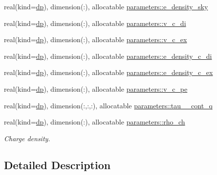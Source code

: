 \begin{DoxyCompactItemize}
\item 
real(kind=\mbox{\hyperlink{namespaceparameters_a52f8c6351fd79345d8811e065bcbbb37}{dp}}), dimension(\+:), allocatable \mbox{\hyperlink{group__OTHER__DENSITIES_ga899215cff7de8d505ca9437a2c7a9e5d}{parameters\+::e\+\_\+density\+\_\+sky}}
\item 
real(kind=\mbox{\hyperlink{namespaceparameters_a52f8c6351fd79345d8811e065bcbbb37}{dp}}), dimension(\+:), allocatable \mbox{\hyperlink{group__OTHER__DENSITIES_ga7503ebd6515d35346e8989c0ace67040}{parameters\+::v\+\_\+c\+\_\+di}}
\item 
real(kind=\mbox{\hyperlink{namespaceparameters_a52f8c6351fd79345d8811e065bcbbb37}{dp}}), dimension(\+:), allocatable \mbox{\hyperlink{group__OTHER__DENSITIES_ga9fa9512dcae76285fafca5bf94f6d548}{parameters\+::v\+\_\+c\+\_\+ex}}
\item 
real(kind=\mbox{\hyperlink{namespaceparameters_a52f8c6351fd79345d8811e065bcbbb37}{dp}}), dimension(\+:), allocatable \mbox{\hyperlink{group__OTHER__DENSITIES_ga87dbb79a5a923879327d170ac2dd0554}{parameters\+::e\+\_\+density\+\_\+c\+\_\+di}}
\item 
real(kind=\mbox{\hyperlink{namespaceparameters_a52f8c6351fd79345d8811e065bcbbb37}{dp}}), dimension(\+:), allocatable \mbox{\hyperlink{group__OTHER__DENSITIES_gae0cdcff4839ee5f5e753521c6110a58c}{parameters\+::e\+\_\+density\+\_\+c\+\_\+ex}}
\item 
real(kind=\mbox{\hyperlink{namespaceparameters_a52f8c6351fd79345d8811e065bcbbb37}{dp}}), dimension(\+:), allocatable \mbox{\hyperlink{group__OTHER__DENSITIES_ga2ace64338ba159caa9b44094efffa81d}{parameters\+::v\+\_\+c\+\_\+pe}}
\item 
real(kind=\mbox{\hyperlink{namespaceparameters_a52f8c6351fd79345d8811e065bcbbb37}{dp}}), dimension(\+:,\+:,\+:), allocatable \mbox{\hyperlink{group__OTHER__DENSITIES_gae767b94dc83914662f299fc87eeaf623}{parameters\+::tau\+\_\+\_\+cont\+\_\+q}}
\item 
real(kind=\mbox{\hyperlink{namespaceparameters_a52f8c6351fd79345d8811e065bcbbb37}{dp}}), dimension(\+:), allocatable \mbox{\hyperlink{group__OTHER__DENSITIES_ga06ab0886762c00b75dd1adf55f9e61a0}{parameters\+::rho\+\_\+ch}}
\begin{DoxyCompactList}\small\item\em Charge density. \end{DoxyCompactList}\end{DoxyCompactItemize}


\subsection{Detailed Description}


